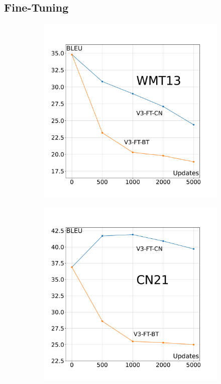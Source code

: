 \documentclass[landscape]{article}
\begin{document}
\subsection*{Fine-Tuning}
\vspace{-5mm}
\begin{figure}[htp]
\begin{subfigure}{.5\textwidth}
\centering
\includegraphics[trim=1cm 1.5cm 1cm 3cm, scale=0.5, clip]{figures/bleu-checkpoints-finetuning-cernnews}
\end{subfigure}
\begin{subfigure}{.5\textwidth}
\centering
\includegraphics[trim=1cm 1.5cm 1cm 3cm, scale=0.5, clip]{figures/bleu-checkpoints-finetuning-backtranslation}
\end{subfigure}
\end{figure}
\end{document}
